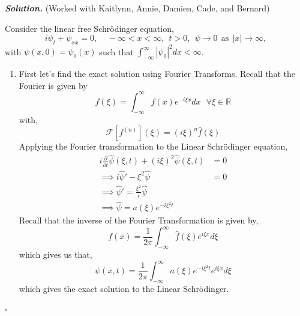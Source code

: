 \documentclass[12pt]{report}
\newenvironment{solution}[1][\it{Solution}]{\textbf{#1. } }{$\square$}
\def\R{{\mathbb R}}
\begin{document}
\begin{solution}
    (Worked with Kaitlynn, Annie, Damien, Cade, and Bernard)

    \noindent
    Consider the linear free Schr\"odinger equation,
    \[
        i\psi_t + \psi_{xx} = 0, ~~~~~-\infty<x<\infty,~~t>0, ~~\psi\rightarrow 0
        ~~\mbox{as}~~ |x|\rightarrow \infty,
    \]
    with $\psi(x,0)=\psi_0(x)$ such that $\int_{-\infty}^\infty|\psi_0|^2
dx<\infty$.
    \begin{enumerate}
        \item First let's find the exact solution using Fourier Transforms. Recall that the Fourier is given by
        \[
            \hat{f}(\xi) = \int_{-\infty}^{\infty} f(x) e^{-i \xi x}dx ~~~ \forall \xi \in \R
        \]
        with,
        \[
            \mathcal{F} [f^{(n)}](\xi) = (i\xi)^n\hat{f}(\xi)
        \]
        Applying the Fourier transformation to the Linear Schr\"odinger equation,
        \begin{align*}
            i \frac{\partial}{\partial t} \hat{\psi}(\xi,t) + (i \xi)^2 \hat{\psi}(\xi,t) &= 0\\
            \implies i \hat{\psi}' - \xi^2 \hat{\psi} &= 0\\
            \implies \hat{\psi}' = \frac{\xi^2}{i}\hat{\psi}\\
            \implies \hat{\psi} = a(\xi) e^{-i\xi^2 t}
        \end{align*}
        Recall that the inverse of the Fourier Transformation is given by,
        \[ 
            f(x) = \frac{1}{2\pi} \int_{-\infty}^{\infty} \hat{f}(\xi)e^{i \xi x}d\xi
        \]
        which gives us that,
        \[
            \psi(x,t) = \frac{1}{2\pi} \int_{-\infty}^{\infty} a(\xi) e^{-i\xi^2 t}e^{i\xi x} d\xi
        \]
        which gives the exact solution to the Linear Schr\"odinger.


\end{enumerate}
\end{solution}
\end{document}

